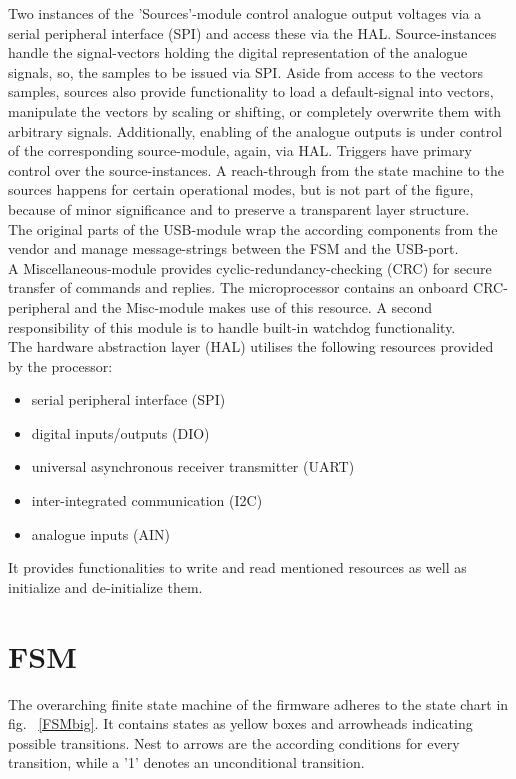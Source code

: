 	Two instances of the 'Sources'-module control analogue output voltages via a serial peripheral interface (SPI) and access these via the HAL. Source-instances handle the signal-vectors holding the digital representation of the analogue signals, so, the samples to be issued via SPI. Aside from access to the vectors samples, sources also provide functionality to load a default-signal into vectors, manipulate the vectors by scaling or shifting, or completely overwrite them with arbitrary signals. Additionally, enabling of the analogue outputs is under control of the corresponding source-module, again, via HAL. Triggers have primary control over the source-instances. A reach-through from the state machine to the sources happens for certain operational modes, but is not part of the figure, because of minor significance and to preserve a transparent layer structure. \\
	
	The original parts of the USB-module wrap the according components from the vendor and manage message-strings between the FSM and the USB-port. \\
	
	A Miscellaneous-module provides cyclic-redundancy-checking (CRC) for secure transfer of commands and replies. The microprocessor contains an onboard CRC-peripheral and the Misc-module makes use of this resource. A second responsibility of this module is to handle built-in watchdog functionality. \\
	
	The hardware abstraction layer (HAL) utilises the following resources provided by the processor:
	\begin{itemize} \setlength\itemsep{1px}
	\item serial peripheral interface (SPI)
	\item digital inputs/outputs (DIO)
	\item universal asynchronous receiver transmitter (UART)
	\item inter-integrated communication (I2C)
	\item analogue inputs (AIN)
	\end{itemize}
	It provides functionalities to write and read mentioned resources as well as initialize and de-initialize them. 
	

	\section{FSM}
	The overarching finite state machine of the firmware adheres to the state chart in fig.	~\ref{FSMbig}. It contains states as yellow boxes and arrowheads indicating possible transitions. Nest to arrows are the according conditions for every transition, while a '1' denotes an unconditional transition. \\
	
